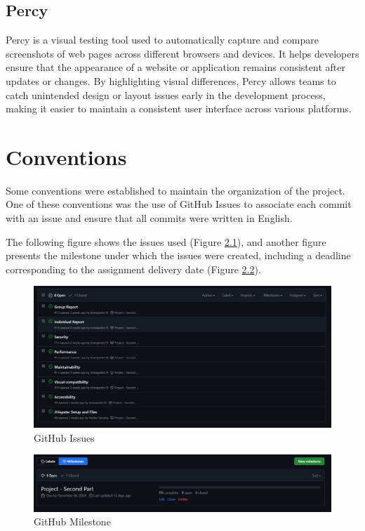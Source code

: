 \documentclass[a4paper,11pt,openright,BCOR=15mm]{scrbook}
\begin{document}
	 \section{Percy}
	Percy is a visual testing tool used to automatically capture and compare screenshots of web pages across different browsers and devices. It helps developers ensure that the appearance of a website or application remains consistent after updates or changes. By highlighting visual differences, Percy allows teams to catch unintended design or layout issues early in the development process, making it easier to maintain a consistent user interface across various platforms.
	 
	
	\chapter{Conventions }
	
	Some conventions were established to maintain the organization of the project. One of these conventions was the use of GitHub Issues to associate each commit with an issue and ensure that all commits were written in English.
	
	The following figure shows the issues used (Figure \ref{fig:githubissues}), and another figure presents the milestone under which the issues were created, including a deadline corresponding to the assignment delivery date (Figure \ref{fig:githubmilestone}).
	
	\begin{figure}[H]
		\centering
		\includegraphics[width=1\linewidth]{figs/githubIssues}
		\caption{GitHub Issues}
		\label{fig:githubissues}
	\end{figure}
	
	\begin{figure}[H]
		\centering
		\includegraphics[width=0.7\linewidth]{figs/githubMilestone}
		\caption{GitHub Milestone}
		\label{fig:githubmilestone}
	\end{figure}
	
\end{document}
